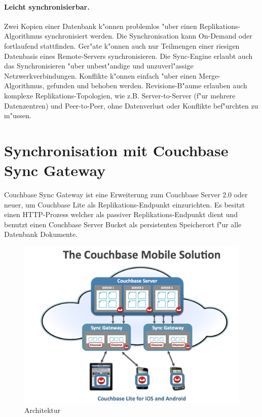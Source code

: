 \documentclass[a4paper,14pt]{scrreprt}
\begin{document}
\paragraph{Leicht synchronisierbar.}
Zwei Kopien einer Datenbank k"onnen problemlos "uber einen Replikations-Algorithmus synchronisiert werden. Die Synchronisation kann On-Demand oder fortlaufend stattfinden. Ger"ate k"onnen auch nur Teilmengen einer riesigen Datenbasis eines Remote-Servers synchronisieren. Die Sync-Engine erlaubt auch das Synchronisieren "uber unbest"andige und unzuverl"assige Netzwerkverbindungen. Konflikte k"onnen einfach "uber einen Merge-Algorithmus, gefunden und behoben werden. Revisions-B"aume erlauben auch komplexe Replikations-Topologien, wie z.B. Server-to-Server (f"ur mehrere Datenzentren) und Peer-to-Peer, ohne Datenverlust oder Konflikte bef"urchten zu m"ussen.
\cite{couch1}
\section{Synchronisation mit Couchbase Sync Gateway}
Couchbase Sync Gateway ist eine Erweiterung zum Couchbase Server 2.0 oder neuer, um Couchbase Lite als Replikations-Endpunkt einzurichten. Es besitzt einen HTTP-Prozess welcher als passiver Replikations-Endpunkt dient und benutzt einen Couchbase Server Bucket als persistenten Speicherort f"ur alle Datenbank Dokumente.\cite{sync1}
\begin{figure}[h!]
\centering
\includegraphics[width=1\linewidth]{./mobile-solution}
\caption[Architektur]{Architektur}
\label{fig:mobile-solution}
\end{figure}

\end{document}
